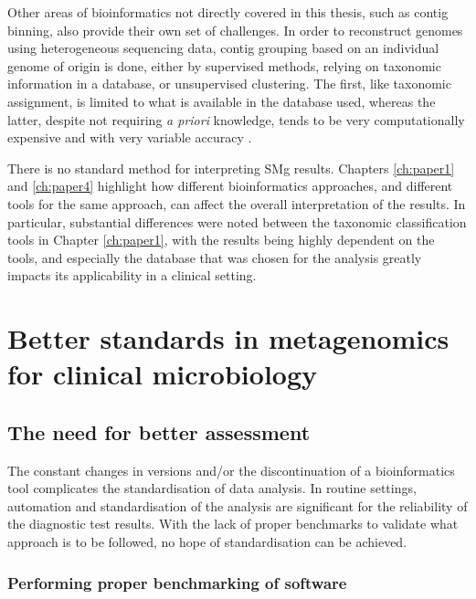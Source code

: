 Other areas of bioinformatics not directly covered in this thesis, such as contig binning, also provide their own set of challenges. In order to reconstruct genomes using heterogeneous sequencing data, contig grouping based on an individual genome of origin is done, either by supervised methods, relying on taxonomic information in a database, or unsupervised clustering. The first, like taxonomic assignment, is limited  to what is available in the database used, whereas the latter, despite not requiring \textit{a priori} knowledge, tends to be very computationally expensive and with very variable accuracy \citep{bharti_current_2021}. 

There is no standard method for interpreting \ac{SMg} results. Chapters \ref{ch:paper1} and \ref{ch:paper4} highlight how different bioinformatics approaches, and different tools for the same approach, can affect the overall interpretation of the results. In particular, substantial differences were noted between the taxonomic classification tools in Chapter \ref{ch:paper1}, with the results being highly dependent on the tools, and especially the database that was chosen for the analysis greatly impacts its applicability in a clinical setting. 

\section{Better standards in metagenomics for clinical microbiology}

\subsection{The need for better assessment}

The constant changes in versions and/or the discontinuation of a bioinformatics tool complicates the standardisation of data analysis. In routine settings, automation and standardisation of the analysis are significant for the reliability of the diagnostic test results. With the lack of proper benchmarks to validate what approach is to be followed, no hope of standardisation can be achieved.

\subsubsection{Performing proper benchmarking of software}

